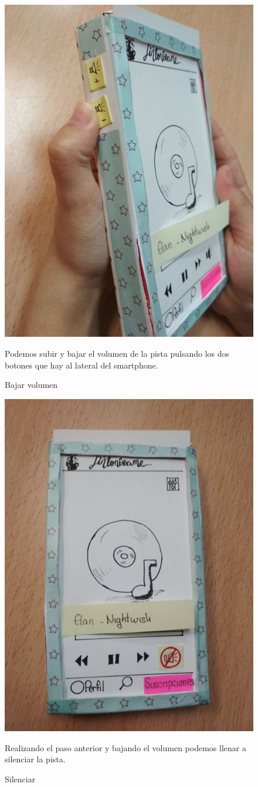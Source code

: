 \documentclass[a4paper]{article}
\begin{document}
\begin{center}
\begin{figure}[H]
\includegraphics[width=0.4\columnwidth]{T2-13.jpg}
\caption{Bajar volumen}
Podemos subir y bajar el volumen de la pista pulsando los dos botones que hay al lateral del smartphone.
\label{fig:t2-15}
\end{figure}
\begin{figure}[H]
\centering
\includegraphics[width=0.4\columnwidth]{T2-14.jpg}
\caption{Silenciar}
\label{fig:t2-17}
Realizando el paso anterior y bajando el volumen podemos llenar a silenciar la pista.
\end{figure}
\end{center}
\end{document}
